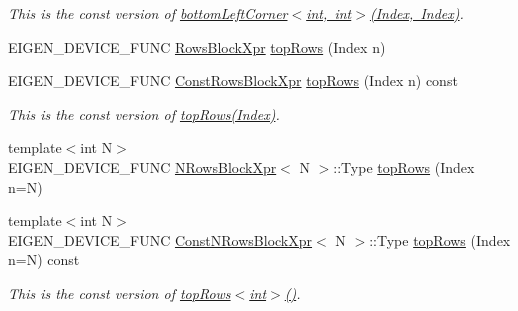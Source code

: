\begin{DoxyCompactItemize}
\begin{DoxyCompactList}\small\item\em This is the const version of \mbox{\hyperlink{class_eigen_1_1_dense_base_a3e7f36548fb49d9e9feac8d563af4ccd}{bottom\+Left\+Corner$<$int, int$>$(\+Index, Index)}}. \end{DoxyCompactList}\item 
E\+I\+G\+E\+N\+\_\+\+D\+E\+V\+I\+C\+E\+\_\+\+F\+U\+NC \mbox{\hyperlink{class_eigen_1_1_block}{Rows\+Block\+Xpr}} \mbox{\hyperlink{class_eigen_1_1_dense_base_ad3e01f9216955704228eaeac0b442d24}{top\+Rows}} (Index n)
\item 
\mbox{\label{class_eigen_1_1_dense_base_a84e5b32db338ec72142ac66fa9bc4786}} 
E\+I\+G\+E\+N\+\_\+\+D\+E\+V\+I\+C\+E\+\_\+\+F\+U\+NC \mbox{\hyperlink{class_eigen_1_1_block}{Const\+Rows\+Block\+Xpr}} \mbox{\hyperlink{class_eigen_1_1_dense_base_a84e5b32db338ec72142ac66fa9bc4786}{top\+Rows}} (Index n) const
\begin{DoxyCompactList}\small\item\em This is the const version of \mbox{\hyperlink{class_eigen_1_1_dense_base_ad3e01f9216955704228eaeac0b442d24}{top\+Rows(\+Index)}}. \end{DoxyCompactList}\item 
{\footnotesize template$<$int N$>$ }\\E\+I\+G\+E\+N\+\_\+\+D\+E\+V\+I\+C\+E\+\_\+\+F\+U\+NC \mbox{\hyperlink{struct_eigen_1_1_dense_base_1_1_n_rows_block_xpr}{N\+Rows\+Block\+Xpr}}$<$ N $>$\+::Type \mbox{\hyperlink{class_eigen_1_1_dense_base_adfabe2228a3ff52ad88e51675aa31557}{top\+Rows}} (Index n=N)
\item 
\mbox{\label{class_eigen_1_1_dense_base_aa1df9d33b29221f4c58b0d0db1c14a11}} 
{\footnotesize template$<$int N$>$ }\\E\+I\+G\+E\+N\+\_\+\+D\+E\+V\+I\+C\+E\+\_\+\+F\+U\+NC \mbox{\hyperlink{struct_eigen_1_1_dense_base_1_1_const_n_rows_block_xpr}{Const\+N\+Rows\+Block\+Xpr}}$<$ N $>$\+::Type \mbox{\hyperlink{class_eigen_1_1_dense_base_aa1df9d33b29221f4c58b0d0db1c14a11}{top\+Rows}} (Index n=N) const
\begin{DoxyCompactList}\small\item\em This is the const version of \mbox{\hyperlink{class_eigen_1_1_dense_base_ad3e01f9216955704228eaeac0b442d24}{top\+Rows$<$int$>$()}}. \end{DoxyCompactList}\item 

\end{DoxyCompactItemize}
